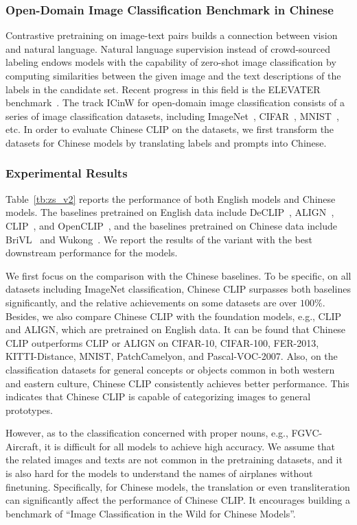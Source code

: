 \documentclass[11pt]{article}
\begin{document}
\subsubsection{Open-Domain Image Classification Benchmark in Chinese}
Contrastive pretraining on image-text pairs builds a connection between vision and natural language. Natural language supervision instead of crowd-sourced labeling endows models with the capability of zero-shot image classification by computing similarities between the given image and the text descriptions of the labels in the candidate set. 
Recent progress in this field is the ELEVATER benchmark~\citep{elevater}. 
The track ICinW for open-domain image classification consists of a series of image classification datasets, including ImageNet~\citep{imagenet}, CIFAR~\citep{cifar}, MNIST~\citep{mnist}, etc.
In order to evaluate Chinese CLIP on the datasets, we first transform the datasets for Chinese models by translating labels and prompts into Chinese. 


\subsubsection{Experimental Results}
Table~\ref{tb:zs_v2} reports the performance of both English models and Chinese models. 
The baselines pretrained on English data include DeCLIP~\citep{declip}, ALIGN~\citep{align}, CLIP~\citep{clip}, and OpenCLIP~\citep{openclip}, and the baselines pretrained on Chinese data include BriVL~\citep{wenlan} and Wukong~\citep{wukong}. 
We report the results of the variant with the best downstream performance for the models. 

We first focus on the comparison with the Chinese baselines. 
To be specific, on all datasets including ImageNet classification, Chinese CLIP surpasses both baselines significantly, and the relative achievements on some datasets are over $100\%$. 
Besides, we also compare Chinese CLIP with the foundation models, e.g., CLIP and ALIGN, which are pretrained on English data. 
It can be found that Chinese CLIP outperforms CLIP or ALIGN on CIFAR-10, CIFAR-100, FER-2013, KITTI-Distance, MNIST, PatchCamelyon, and Pascal-VOC-2007. 
Also, on the classification datasets for general concepts or objects common in both western and eastern culture, Chinese CLIP consistently achieves better performance. 
This indicates that Chinese CLIP is capable of categorizing images to general prototypes. 

However, as to the classification concerned with proper nouns, e.g., FGVC-Aircraft, it is difficult for all models to achieve high accuracy. 
We assume that the related images and texts are not common in the pretraining datasets, and it is also hard for the models to understand the names of airplanes without finetuning. 
Specifically, for Chinese models, the translation or even transliteration can significantly affect the performance of Chinese CLIP. It encourages building a benchmark of ``Image Classification in the Wild for Chinese Models''. 
\end{document}
